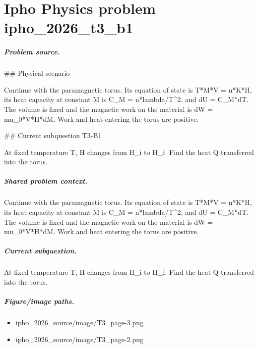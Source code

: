 
\chapter{Ipho Physics problem ipho\_2026\_t3\_b1}
\label{ch:IPhO2026Problems_problem_ipho_2026_t3_b1}

\paragraph{Problem source.}
\#\# Physical scenario

Continue with the paramagnetic torus.  Its equation of state is T*M*V = n*K*H,
its heat capacity at constant M is C\_M = n*lambda/T\textasciicircum{}2, and dU = C\_M*dT.
The volume is fixed and the magnetic work on the material is
dW = mu\_0*V*H*dM.  Work and heat entering the torus are positive.

\#\# Current subquestion T3-B1

At fixed temperature T, H changes from H\_i to H\_f. Find the heat Q transferred into the torus.

\paragraph{Shared problem context.}
Continue with the paramagnetic torus.  Its equation of state is T*M*V = n*K*H,
its heat capacity at constant M is C\_M = n*lambda/T\textasciicircum{}2, and dU = C\_M*dT.
The volume is fixed and the magnetic work on the material is
dW = mu\_0*V*H*dM.  Work and heat entering the torus are positive.

\paragraph{Current subquestion.}
At fixed temperature T, H changes from H\_i to H\_f. Find the heat Q transferred into the torus.

\paragraph{Figure/image paths.}
\begin{itemize}
\item ipho\_2026\_source/image/T3\_page-3.png
\item ipho\_2026\_source/image/T3\_page-2.png
\end{itemize}

